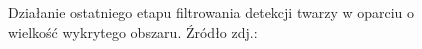 \begin{itemize}
\begin{figure}[!h]
\begin{center}
        \end{center}
        \caption{Działanie ostatniego etapu filtrowania detekcji twarzy w oparciu o wielkość wykrytego obszaru. Źródło zdj.: \cite{readheadPortrait1}}
        \label{fig:face_size}
    \end{figure}
    
    
    
\end{itemize}